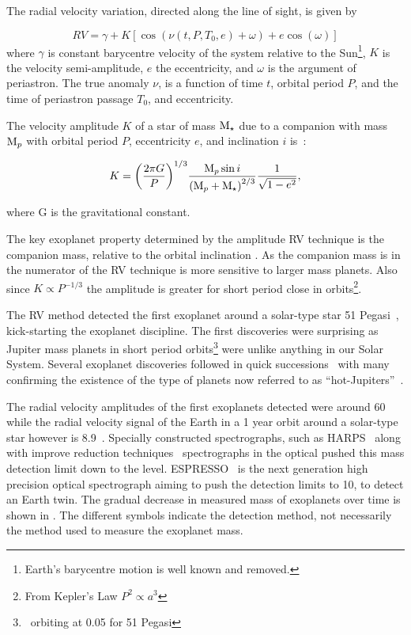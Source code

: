 The radial velocity variation, directed along the line of sight, is given by

\begin{equation}
\label{eq:rv_equation_intro}
{RV} = \gamma + K [\cos{(\nu(t, P, T_0, e) + \omega)} + e\cos{(\omega)}]
\end{equation}
where $\gamma$ is constant barycentre velocity of the system relative to the Sun\footnote{Earth's barycentre motion is well known and removed.}, \(K\) is the velocity semi-amplitude, \(e\) the eccentricity, and \(\omega\) is the argument of periastron.
The true anomaly \(\nu\), is a function of time \(t\), orbital period \(P\), and the time of periastron passage \(T_0\), and eccentricity.

The velocity amplitude $K$ of a star of mass $\textrm{M}_{\star}$ due to a companion with mass $\textrm{M}_{p}$ with orbital period $P$, eccentricity $e$, and inclination $i$ is~\citep[e.g.][]{cumming_lick_1999}:

\begin{equation}
    K = {\left(\frac{2\pi G}{P}\right)}^{1/3} \frac{\textrm{M}_{p}{} \sin{i}}{{(\textrm{M}_{p}{} + \textrm{M}_{\star})}^{2/3}} \frac{1}{\sqrt{1-{e}^{2}}}, \label{eq:k_amplitude}
\end{equation}

where G is the gravitational constant.

The key exoplanet property determined by the amplitude {RV} technique is the companion mass, relative to the orbital inclination \Mpsini.
As the companion mass is in the numerator of  the {RV} technique is more sensitive to larger mass planets.
Also since $K \propto P^{-1/3}$ the amplitude is greater for short period close in orbits\footnote{From Kepler's Law ${P}^{2}\propto {a}^{3}$}.

The RV method detected the first exoplanet around a solar-type star {51 Pegasi}~\citep{mayor_jupitermass_1995}, kick-starting the exoplanet discipline.
The first discoveries were surprising as Jupiter mass planets in short period orbits\footnote{\,\Mjup{} orbiting at 0.05\AU{} for {51 Pegasi}} were unlike anything in our Solar System.
Several exoplanet discoveries followed in quick successions~\citep[e.g.][]{butler_planet_1996, marcy_planetary_1996} with many confirming the existence of the type of planets now referred to as ``hot-Jupiters''~\citep{butler_three_1997, charbonneau_detection_2000}.

The radial velocity amplitudes of the first exoplanets detected were around 60\mps{} while
the radial velocity signal of the Earth in a 1 year orbit around a solar-type star however is 8.9\cmps{}~\citep{figueira_radial_2010}.
Specially constructed spectrographs, such as HARPS~\citep{mayor_setting_2003} along with improve reduction techniques~\citet{lovis_new_2007} spectrographs in the optical pushed this mass detection limit down to the \mps{} level. ESPRESSO~\citep{pepe_espresso_2014, megevand_espresso_2014} is the next generation high precision optical spectrograph aiming to push the detection limits to 10\cmps, to detect an Earth twin.
The gradual decrease in measured mass of exoplanets over time is shown in . The different symbols indicate the detection method, not necessarily the method used to measure the exoplanet mass.

